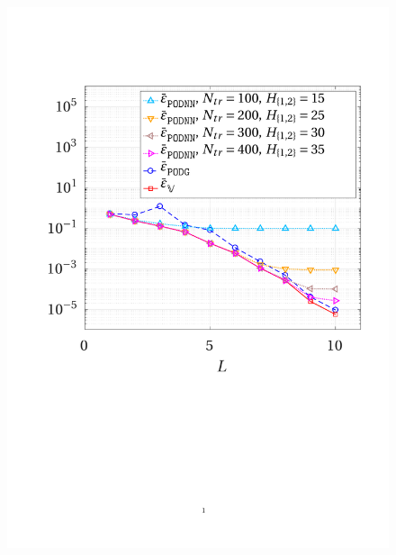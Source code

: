 \documentclass[12pt, a4paper, twoside, openright, notitlepage]{report}
\numberwithin{equation}{chapter}
\theoremstyle{theorem}
\theoremstyle{definition}
\theoremstyle{remark}
\theoremstyle{proposition}
\numberwithin{figure}{chapter}
\begin{document}
		\begin{figure}[H]
			\center
			\includegraphics[scale = 0.4, trim = {1cm 9cm 1cm 3cm}, clip]{poisson1d_3_error_vs_rank}

\end{figure}
\end{document}
